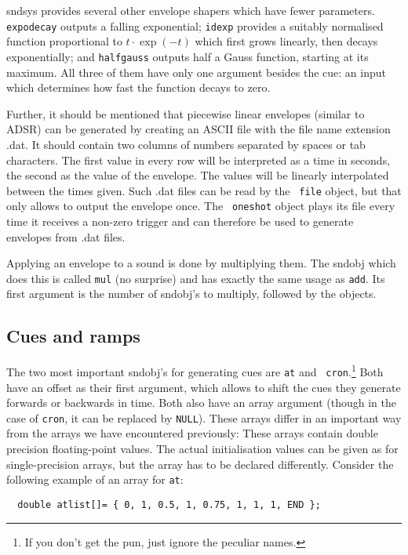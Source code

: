 \documentclass{article}
\def\s{{\sc sndsys} }
\def\bv{\begin{verbatim}}
\begin{document}
\s provides several other envelope shapers which have fewer parameters.  {\tt
expodecay} outputs a falling exponential; {\tt idexp} provides a suitably
normalised function proportional to $t\cdot\exp(-t)$ which first grows
linearly, then decays exponentially; and {\tt halfgauss} outputs half a Gauss
function, starting at its maximum.  All three of them have only one argument
besides the cue: an input which determines how fast the function decays to
zero.

Further, it should be mentioned that piecewise linear envelopes (similar to
ADSR) can be generated by creating an ASCII file with the file name extension
.dat.  It should contain two columns of numbers separated by spaces or tab
characters.  The first value in every row will be interpreted as a time in
seconds, the second as the value of the envelope.  The values will be linearly
interpolated between the times given.  Such .dat files can be read by the {\tt
file} object, but that only allows to output the envelope once.  The {\tt
oneshot} object plays its file every time it receives a non-zero trigger and
can therefore be used to generate envelopes from .dat files.

Applying an envelope to a sound is done by multiplying them.  The sndobj which
does this is called {\tt mul} (no surprise) and has exactly the same usage as
{\tt add}.  Its first argument is the number of sndobj's to multiply, followed
by the objects.


\subsection{Cues and ramps}

The two most important sndobj's for generating cues are {\tt at} and {\tt
cron}.\footnote{If you don't get the pun, just ignore the peculiar names.}
Both have an offset as their first argument, which allows to shift the cues
they generate forwards or backwards in time.  Both also have an array argument
(though in the case of {\tt cron}, it can be replaced by {\tt NULL}).  These
arrays differ in an important way from the arrays we have encountered
previously:  These arrays contain double precision floating-point values.  The
actual initialisation values can be given as for single-precision arrays, but
the array has to be declared differently.  Consider the following example of an
array for {\tt at}:

\bv
  double atlist[]= { 0, 1, 0.5, 1, 0.75, 1, 1, 1, END };
\end{verbatim}
\end{document}
